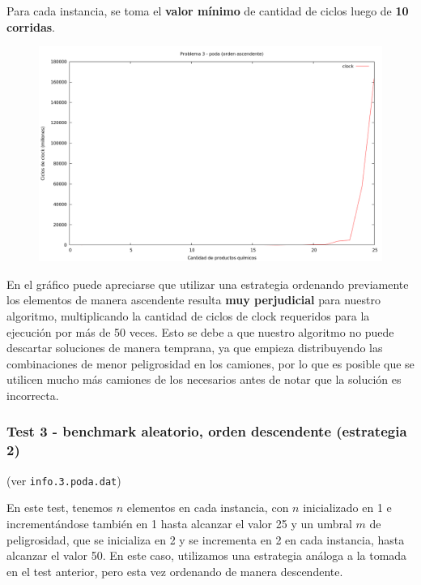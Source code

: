 Para cada instancia, se toma el \textbf{valor mínimo} de cantidad de ciclos luego de \textbf{10 corridas}.

\vspace*{0.5cm}

\begin{figure}[h]
  \begin{center}
    \includegraphics[scale=0.35]{imagenes/grafico-3-poda-a.png}
  \end{center}
\end{figure}

\vspace*{0.5cm}

En el gráfico puede apreciarse que utilizar una estrategia ordenando previamente los elementos de
manera ascendente resulta \textbf{muy perjudicial} para nuestro algoritmo, multiplicando la cantidad de ciclos
de clock requeridos para la ejecución por más de 50 veces. Esto se debe a que nuestro algoritmo
no puede descartar soluciones de manera temprana, ya que empieza distribuyendo las combinaciones de menor
peligrosidad en los camiones, por lo que es posible que se utilicen mucho más camiones de los necesarios
antes de notar que la solución es incorrecta.


\newpage
\subsubsection{Test 3 - benchmark aleatorio, orden descendente (estrategia 2)}

(ver \verb|info.3.poda.dat|) \medskip

En este test, tenemos $n$ elementos en cada instancia, con $n$ inicializado en 1 e incrementándose
también en 1 hasta alcanzar el valor 25 y un umbral $m$ de peligrosidad, que se inicializa en 2 y se incrementa
en 2 en cada instancia, hasta alcanzar el valor 50. En este caso, utilizamos una estrategia análoga a la
tomada en el test anterior, pero esta vez ordenando de manera descendente.


